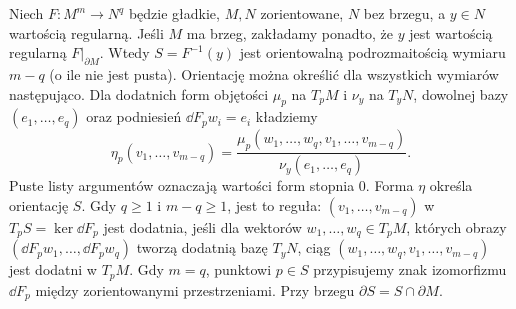 \begin{twierdzenie}
\label{thm:orientacja-poziomicy}
Niech $F:M^m\to N^q$ będzie gładkie,
$M,N$ zorientowane, $N$ bez brzegu, a $y\in N$ wartością
regularną. Jeśli $M$ ma brzeg, zakładamy ponadto, że $y$
jest wartością regularną $F|_{\partial M}$.
Wtedy $S=F^{-1}(y)$ jest orientowalną podrozmaitością
wymiaru $m-q$ (o ile nie jest pusta). Orientację
można określić dla wszystkich wymiarów następująco.
Dla dodatnich form objętości $\mu_p$ na $T_pM$
i $\nu_y$ na $T_yN$, dowolnej bazy $(e_1,\ldots,e_q)$
oraz podniesień $\dd F_pw_i=e_i$ kładziemy
\[
 \eta_p(v_1,\ldots,v_{m-q})
 =\frac{\mu_p(w_1,\ldots,w_q,v_1,\ldots,v_{m-q})}
        {\nu_y(e_1,\ldots,e_q)}.
\]
Puste listy argumentów oznaczają wartości form stopnia $0$.
Forma $\eta$ określa orientację $S$. Gdy $q\geq1$
i $m-q\geq1$, jest to reguła: $(v_1,\ldots,v_{m-q})$
w $T_pS=\ker\dd F_p$ jest dodatnia, jeśli dla
wektorów $w_1,\ldots,w_q\in T_pM$, których obrazy
$(\dd F_pw_1,\ldots,\dd F_pw_q)$ tworzą dodatnią
bazę $T_yN$, ciąg
$(w_1,\ldots,w_q,v_1,\ldots,v_{m-q})$
jest dodatni w $T_pM$. Gdy $m=q$, punktowi $p\in S$
przypisujemy znak izomorfizmu $\dd F_p$ między
zorientowanymi przestrzeniami. Przy brzegu
$\partial S=S\cap\partial M$.
\end{twierdzenie}
